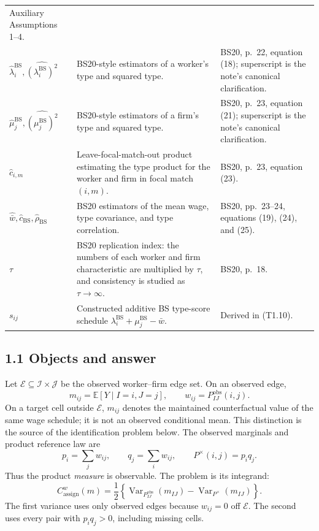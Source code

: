 \documentclass[11pt]{article}
\begin{document}
\begin{longtable}{p{}p{}p{}}
Auxiliary Assumptions 1--4. \\
\(\widehat\lambda_i^{\mathrm{BS}},
\widehat{(\lambda_i^{\mathrm{BS}})^2}\) & BS20-style estimators of a
worker's type and squared type. & BS20, p.\ 22, equation (18); superscript
is the note's canonical clarification. \\
\(\widehat\mu_j^{\mathrm{BS}},
\widehat{(\mu_j^{\mathrm{BS}})^2}\) & BS20-style estimators of a firm's type
and squared type. & BS20, p.\ 23, equation (21); superscript is the note's
canonical clarification. \\
\(\widehat c_{i,m}\) & Leave-focal-match-out product estimating the type
product for the worker and firm in focal match \((i,m)\). & BS20, p.\ 23,
equation (23). \\
\(\widehat{\bar w},\widehat c_{\mathrm{BS}},\widehat\rho_{\mathrm{BS}}\) &
BS20 estimators of the mean wage, type covariance, and type correlation. &
BS20, pp.\ 23--24, equations (19), (24), and (25). \\
\(\tau\) & BS20 replication index: the numbers of each worker and firm
characteristic are multiplied by \(\tau\), and consistency is studied as
\(\tau\to\infty\). & BS20, p.\ 18. \\
\(s_{ij}\) & Constructed additive BS type-score schedule
\(\lambda_i^{\mathrm{BS}}+\mu_j^{\mathrm{BS}}-\bar w\). & Derived in
(T1.10). \\
\end{longtable}
\subsection{1.1 Objects and answer}

Let \(\mathcal E\subseteq\mathcal I\times\mathcal J\) be the observed
worker--firm edge set.  On an observed edge,
\[
m_{ij}=\mathbb E[Y\mid I=i,J=j],
\qquad
w_{ij}=P^{\mathrm{obs}}_{IJ}(i,j).
\tag{T1.1}
\]
On a target cell outside \(\mathcal E\), \(m_{ij}\) denotes the maintained
counterfactual value of the same wage schedule; it is not an observed
conditional mean.  This distinction is the source of the identification
problem below.
The observed marginals and product reference law are
\[
p_i=\sum_jw_{ij},
\qquad
q_j=\sum_iw_{ij},
\qquad
P^\times(i,j)=p_iq_j.
\tag{T1.2}
\]
Thus the product \emph{measure} is observable.  The problem is its integrand:
\[
C^w_{\mathrm{assign}}(m)
=
\frac12\left\{
\operatorname{Var}_{P^{\mathrm{obs}}_{IJ}}(m_{IJ})
-\operatorname{Var}_{P^\times}(m_{IJ})
\right\}.
\tag{T1.3}
\]
The first variance uses only observed edges because \(w_{ij}=0\) off
\(\mathcal E\).  The second uses every pair with \(p_iq_j>0\), including
missing cells.
\end{document}
